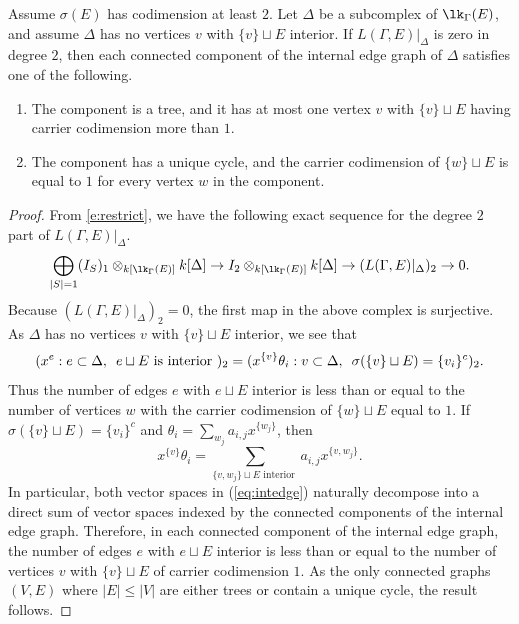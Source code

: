 \begin{lemma}\label{lem:intedge}
Assume $\sigma(E)$ has codimension at least $2$. Let $\Delta$ be a subcomplex of $\lk_{\Gamma}(E)$, and assume $\Delta$ has no vertices $v$ with $\{v\} \sqcup E$ interior. If $L(\Gamma, E)|_{\Delta}$ is zero in degree $2$, then each connected component of the internal edge graph of $\Delta$ satisfies one of the following.
\begin{enumerate}
\item The component is a tree, and it has at most one  vertex $v$ with $\{v\} \sqcup E$ having carrier codimension more than $1$. 
\item The component has a unique cycle, and the carrier codimension of $\{w\} \sqcup E$ is equal to $1$ for every vertex $w$ in the component. 
\end{enumerate}
\end{lemma}

\begin{proof}
From \eqref{e:restrict}, we have the following exact sequence for the degree $2$ part of $L(\Gamma, E)|_{\Delta}$.
$$ \bigoplus_{\vert S \vert = 1} (I_S)_1\otimes_{k[\lk_{\Gamma}(E)]} k[\Delta]  \to I_2\otimes_{k[\lk_{\Gamma}(E)]} k[\Delta] \to (L(\Gamma, E)|_{\Delta})_2 \to 0.$$
Because $(L(\Gamma, E)|_{\Delta})_2 = 0$, the first map in the above complex is surjective.  As $\Delta$ has no vertices $v$ with $\{v\} \sqcup E$ interior, we see that
\begin{equation}\label{eq:intedge}
(x^{e}: e \subset \Delta, \enskip e \sqcup E \text{ is interior })_2 = (x^{\{v\}} \theta_{i}: v \subset \Delta, \enskip \sigma(\{v\} \sqcup E) = \{v_i\}^c)_2.
\end{equation}
Thus the number of edges $e$ with $e \sqcup E$ interior is less than or equal to the number of vertices $w$ with the carrier codimension of $\{w\} \sqcup E$ equal to $1$. If $\sigma(\{v\} \sqcup E) = \{v_i\}^c$ and $\theta_{i} = \sum_{w_j} a_{i,j}x^{\{w_j\}}$, then 
$$x^{\{v\}} \theta_{i} = \sum_{\{v, w_j\} \sqcup E \text{ interior }} a_{i,j}x^{\{v, w_j\}}.$$ In particular, both vector spaces in (\ref{eq:intedge}) naturally decompose into a direct sum of vector spaces indexed by the connected components of the internal edge graph. Therefore, in each connected component of the internal edge graph, the number of edges $e$ with $e \sqcup E$ interior is less than or equal to the number of vertices $v$ with $\{v\} \sqcup E$ of carrier codimension $1$. As the only connected graphs $(V, E)$ where $\vert E \vert \le \vert V \vert$ are either trees or contain a unique cycle, the result follows.
\end{proof}


